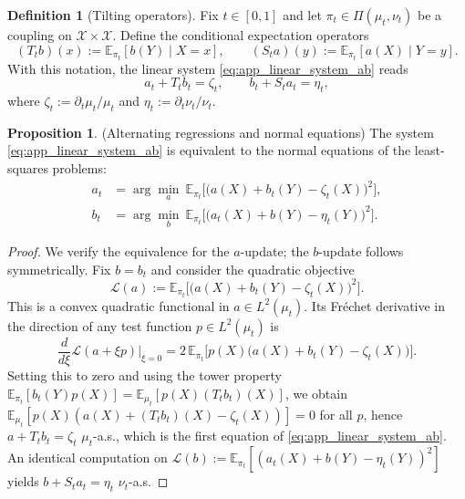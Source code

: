 \documentclass[11pt]{article}
\theoremstyle{definition}
\newtheorem{definition}[theorem]{Definition}
\newtheorem{proposition}[theorem]{Proposition}
\numberwithin{equation}{section}%
\begin{document}
{\begin{definition}[Tilting operators]
\label{def:tilting_operators}
Fix $t\in[0,1]$ and let $\pi_t\in\Pi(\mu_t,\nu_t)$ be a coupling on $\mathcal X\times\mathcal X$.
Define the conditional expectation operators
\[
(T_t b)(x):=\mathbb E_{\pi_t}[b(Y)\mid X=x],\qquad
(S_t a)(y):=\mathbb E_{\pi_t}[a(X)\mid Y=y].
\]
With this notation, the linear system \eqref{eq:app_linear_system_ab} reads
\begin{equation}
\label{eq:app_linear_system_ab_TS}
a_t+T_t b_t=\zeta_t,\qquad b_t+S_t a_t=\eta_t,
\end{equation}
where $\zeta_t:=\partial_t\mu_t/\mu_t$ and $\eta_t:=\partial_t\nu_t/\nu_t$.
\end{definition}

\begin{proposition}{(Alternating regressions and normal equations)}
\label{prop:alt_regression}
The system \eqref{eq:app_linear_system_ab} is equivalent to the normal equations of the least-squares problems:
\begin{equation}
\label{eq:alt-updates}
    \begin{aligned}
    a_t &= \arg\min_{a}\ \mathbb{E}_{\pi_t}\!\Big[\big(a(X)+b_t(Y)-\zeta_t(X)\big)^2\Big],\\
    b_t &= \arg\min_{b}\ \mathbb{E}_{\pi_t}\!\Big[\big(a_t(X)+b(Y)-\eta_t(Y)\big)^2\Big].
    \end{aligned}
\end{equation}
\end{proposition}

\begin{proof}
We verify the equivalence for the $a$-update; the $b$-update follows symmetrically.
Fix $b = b_t$ and consider the quadratic objective
\[
\mathcal{L}(a) := \mathbb{E}_{\pi_t}\!\Big[\big(a(X)+b_t(Y)-\zeta_t(X)\big)^2\Big].
\]
This is a convex quadratic functional in $a \in L^2(\mu_t)$.
Its Fr\'echet derivative in the direction of any test function $p \in L^2(\mu_t)$ is
\[
\frac{d}{d\xi}\mathcal{L}(a+\xi p)\Big|_{\xi=0}
= 2\,\mathbb{E}_{\pi_t}\!\Big[p(X)\big(a(X)+b_t(Y)-\zeta_t(X)\big)\Big].
\]
Setting this to zero and using the tower property
$\mathbb{E}_{\pi_t}[b_t(Y)p(X)] = \mathbb{E}_{\mu_t}[p(X)(T_t b_t)(X)]$, we obtain
$\mathbb{E}_{\mu_t}[p(X)(a(X)+(T_t b_t)(X)-\zeta_t(X))]=0$ for all $p$,
hence $a + T_t b_t = \zeta_t$ $\mu_t$-a.s., which is the first equation of
\eqref{eq:app_linear_system_ab}.
An identical computation on $\mathcal{L}(b) := \mathbb{E}_{\pi_t}[(a_t(X)+b(Y)-\eta_t(Y))^2]$
yields $b + S_t a_t = \eta_t$ $\nu_t$-a.s.
\end{proof}

}
\end{document}
